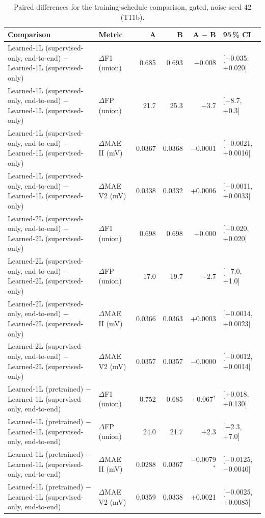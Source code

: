 \begin{table}[htbp]
\centering
\small
\caption{Paired differences for the training-schedule comparison, gated, noise seed 42 (T11b).}
\label{tab:t11b_schedule_paired}
\begin{tabular}{llrrrl}
\toprule
Comparison & Metric & A & B & A $-$ B & 95\,\% CI \\
\midrule
Learned-1L (supervised-only, end-to-end) $-$ Learned-1L (supervised-only) & $\Delta$F1 (union) & 0.685 & 0.693 & $-$0.008 & [$-$0.035, +0.020] \\
Learned-1L (supervised-only, end-to-end) $-$ Learned-1L (supervised-only) & $\Delta$FP (union) & 21.7 & 25.3 & $-$3.7 & [$-$8.7, +0.3] \\
Learned-1L (supervised-only, end-to-end) $-$ Learned-1L (supervised-only) & $\Delta$MAE II (mV) & 0.0367 & 0.0368 & $-$0.0001 & [$-$0.0021, +0.0016] \\
Learned-1L (supervised-only, end-to-end) $-$ Learned-1L (supervised-only) & $\Delta$MAE V2 (mV) & 0.0338 & 0.0332 & +0.0006 & [$-$0.0011, +0.0033] \\
Learned-2L (supervised-only, end-to-end) $-$ Learned-2L (supervised-only) & $\Delta$F1 (union) & 0.698 & 0.698 & +0.000 & [$-$0.020, +0.020] \\
Learned-2L (supervised-only, end-to-end) $-$ Learned-2L (supervised-only) & $\Delta$FP (union) & 17.0 & 19.7 & $-$2.7 & [$-$7.0, +1.0] \\
Learned-2L (supervised-only, end-to-end) $-$ Learned-2L (supervised-only) & $\Delta$MAE II (mV) & 0.0366 & 0.0363 & +0.0003 & [$-$0.0014, +0.0023] \\
Learned-2L (supervised-only, end-to-end) $-$ Learned-2L (supervised-only) & $\Delta$MAE V2 (mV) & 0.0357 & 0.0357 & $-$0.0000 & [$-$0.0012, +0.0014] \\
Learned-1L (pretrained) $-$ Learned-1L (supervised-only, end-to-end) & $\Delta$F1 (union) & 0.752 & 0.685 & +0.067$^{*}$ & [+0.018, +0.130] \\
Learned-1L (pretrained) $-$ Learned-1L (supervised-only, end-to-end) & $\Delta$FP (union) & 24.0 & 21.7 & +2.3 & [$-$2.3, +7.0] \\
Learned-1L (pretrained) $-$ Learned-1L (supervised-only, end-to-end) & $\Delta$MAE II (mV) & 0.0288 & 0.0367 & $-$0.0079$^{*}$ & [$-$0.0125, $-$0.0040] \\
Learned-1L (pretrained) $-$ Learned-1L (supervised-only, end-to-end) & $\Delta$MAE V2 (mV) & 0.0359 & 0.0338 & +0.0021 & [$-$0.0025, +0.0085] \\

\end{tabular}
\end{table}
